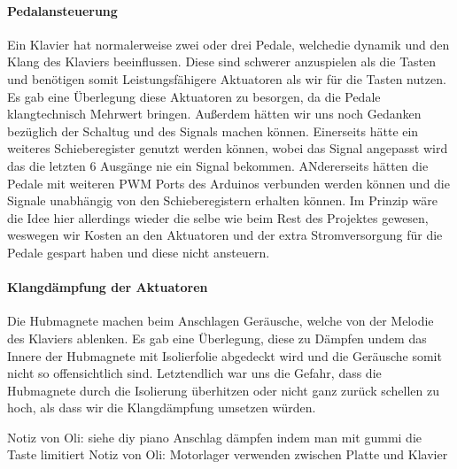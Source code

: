 \paragraph{Pedalansteuerung}
Ein Klavier hat normalerweise zwei oder drei Pedale, welchedie dynamik und den Klang des Klaviers beeinflussen.
Diese sind schwerer anzuspielen als die Tasten und benötigen somit Leistungsfähigere Aktuatoren als wir für die
Tasten nutzen. Es gab eine Überlegung diese Aktuatoren zu besorgen, da die Pedale klangtechnisch Mehrwert bringen.
Außerdem hätten wir uns noch Gedanken bezüglich der Schaltug und des Signals machen können. Einerseits hätte ein weiteres
Schieberegister genutzt werden können, wobei das Signal angepasst wird das die letzten 6 Ausgänge nie ein Signal bekommen.
ANdererseits hätten die Pedale mit weiteren PWM Ports des Arduinos verbunden werden können und die Signale unabhängig von den
Schieberegistern erhalten können. Im Prinzip wäre die Idee hier allerdings wieder die selbe wie beim Rest des Projektes gewesen,
weswegen wir Kosten an den Aktuatoren und der extra Stromversorgung für die Pedale gespart haben und diese nicht ansteuern.

\paragraph{Klangdämpfung der Aktuatoren}
Die Hubmagnete machen beim Anschlagen Geräusche, welche von der Melodie des Klaviers ablenken. Es gab eine Überlegung,
diese zu Dämpfen undem das Innere der Hubmagnete mit Isolierfolie abgedeckt wird und die Geräusche somit nicht so
offensichtlich sind. Letztendlich war uns die Gefahr, dass die Hubmagnete durch die Isolierung überhitzen oder nicht ganz
zurück schellen zu hoch, als dass wir die Klangdämpfung umsetzen würden.

Notiz von Oli: siehe diy piano Anschlag dämpfen indem man mit gummi die Taste limitiert
Notiz von Oli: Motorlager verwenden zwischen Platte und Klavier
